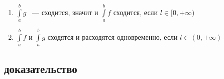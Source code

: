 \documentclass{article}
\begin{document}
\begin{enumerate}
\begin{itemize}
                            \begin{enumerate}
                            
                                \item $\int\limits^b_a g$ ~--- сходится, значит и $\int\limits^b_a f$ сходится, если $l \in [0, +\infty)$
                                
                                \item $\int\limits^b_a f$ и $\int\limits^b_a g$ сходятся и расходятся одновременно, если $l \in (0, +\infty)$
                                
                            \end{enumerate}
                        
                    \end{itemize}
                
            \end{enumerate}
        
        \subsection{доказательство}
        
\end{document}
